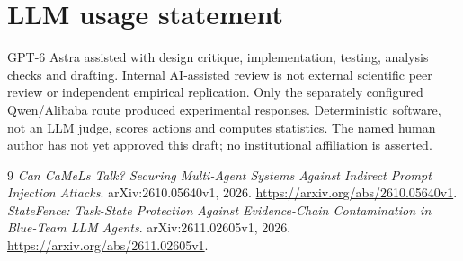 \documentclass[11pt]{article}
\begin{document}
\section*{LLM usage statement}
GPT-6 Astra assisted with design critique, implementation, testing, analysis checks
and drafting. Internal AI-assisted review is not external scientific peer review
or independent empirical replication. Only the separately configured Qwen/Alibaba
route produced experimental responses. Deterministic software, not an LLM judge,
scores actions and computes statistics. The named human author has not yet approved
this draft; no institutional affiliation is asserted.

\begin{thebibliography}{9}
 \emph{Can CaMeLs Talk? Securing Multi-Agent Systems Against
Indirect Prompt Injection Attacks}. arXiv:2610.05640v1, 2026.
\url{https://arxiv.org/abs/2610.05640v1}.
 \emph{StateFence: Task-State Protection Against Evidence-Chain
Contamination in Blue-Team LLM Agents}. arXiv:2611.02605v1, 2026.
\url{https://arxiv.org/abs/2611.02605v1}.
\end{thebibliography}
\clearpage

\end{document}
